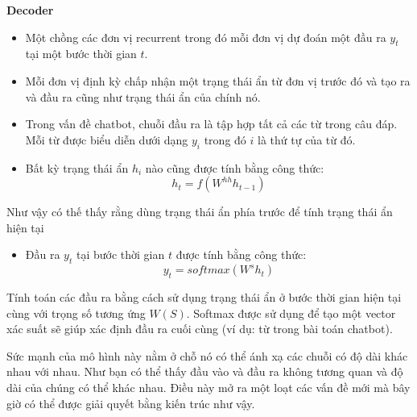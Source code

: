 \textbf{Decoder}
\begin{itemize}
    \item Một chồng các đơn vị recurrent trong đó mỗi đơn vị dự đoán một đầu ra \(y_t\) tại một bước thời gian \(t\).
    \item Mỗi đơn vị định kỳ chấp nhận một trạng thái ẩn từ đơn vị trước đó và tạo ra và đầu ra cũng như trạng thái ẩn
    của chính nó.
    \item Trong vấn đề chatbot, chuỗi đầu ra là tập hợp tất cả các từ trong câu đáp. Mỗi từ được biểu diễn
    dưới dạng \(y_i\) trong đó \(i\) là thứ tự của từ đó.
    \item Bất kỳ trạng thái ẩn \(h_i\) nào cũng được tính bằng công thức:
        \[h_t=f(W^{hh}h_{t-1})\]
\end{itemize}
Như vậy có thế thấy rằng dùng trạng thái ẩn phía trước để tính trạng thái ẩn hiện tại
\begin{itemize}
    \item Đầu ra \(y_t\) tại bước thời gian \(t\) được tính bằng công thức:
        \[y_t=softmax(W^{s}h_{t})\]
\end{itemize}
Tính toán các đầu ra bằng cách sử dụng trạng thái ẩn ở bước thời gian hiện tại cùng với trọng số tương ứng
\(W(S)\). Softmax được sử dụng để tạo một vector xác suất sẽ giúp xác định đầu ra cuối cùng (ví dụ: từ
trong bài toán chatbot).

Sức mạnh của mô hình này nằm ở chỗ nó có thể ánh xạ các chuỗi có độ dài khác nhau với nhau. Như bạn có thể thấy đầu
vào và đầu ra không tương quan và độ dài của chúng có thể khác nhau. Điều này mở ra một loạt các vấn đề mới mà  bây
giờ có thể được giải quyết bằng kiến trúc như vậy.